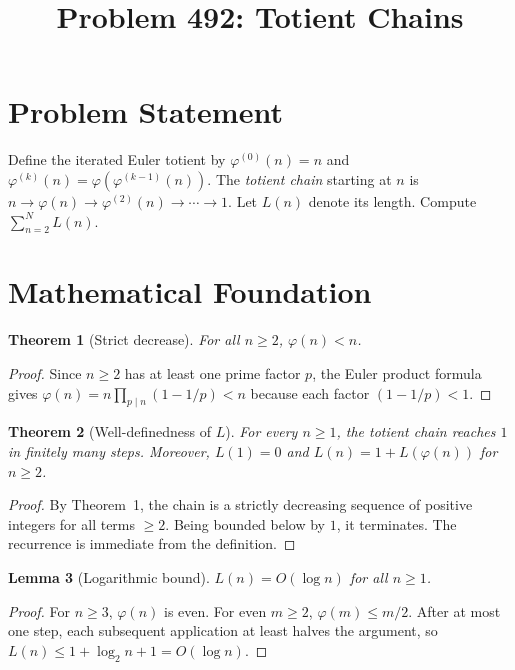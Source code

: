 \documentclass[12pt]{article}
\title{Problem 492: Totient Chains}
\author{}
\date{}
\newtheorem{theorem}{Theorem}
\newtheorem{lemma}[theorem]{Lemma}
\begin{document}
\maketitle

\section{Problem Statement}
Define the iterated Euler totient by $\varphi^{(0)}(n) = n$ and $\varphi^{(k)}(n) = \varphi(\varphi^{(k-1)}(n))$. The \emph{totient chain} starting at $n$ is $n \to \varphi(n) \to \varphi^{(2)}(n) \to \cdots \to 1$. Let $L(n)$ denote its length. Compute $\sum_{n=2}^{N} L(n)$.

\section{Mathematical Foundation}

\begin{theorem}[Strict decrease]
For all $n \ge 2$, $\varphi(n) < n$.
\end{theorem}

\begin{proof}
Since $n \ge 2$ has at least one prime factor $p$, the Euler product formula gives $\varphi(n) = n\prod_{p \mid n}(1 - 1/p) < n$ because each factor $(1 - 1/p) < 1$.
\end{proof}

\begin{theorem}[Well-definedness of $L$]
For every $n \ge 1$, the totient chain reaches $1$ in finitely many steps. Moreover, $L(1) = 0$ and $L(n) = 1 + L(\varphi(n))$ for $n \ge 2$.
\end{theorem}

\begin{proof}
By Theorem~1, the chain is a strictly decreasing sequence of positive integers for all terms $\ge 2$. Being bounded below by $1$, it terminates. The recurrence is immediate from the definition.
\end{proof}

\begin{lemma}[Logarithmic bound]
$L(n) = O(\log n)$ for all $n \ge 1$.
\end{lemma}

\begin{proof}
For $n \ge 3$, $\varphi(n)$ is even. For even $m \ge 2$, $\varphi(m) \le m/2$. After at most one step, each subsequent application at least halves the argument, so $L(n) \le 1 + \log_2 n + 1 = O(\log n)$.
\end{proof}
\end{document}
